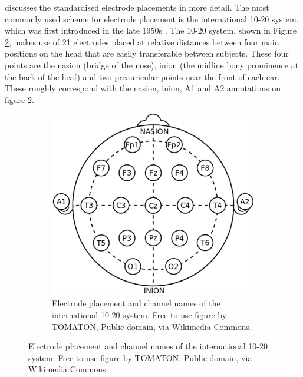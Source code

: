  discusses the standardised electrode placements in more detail.
The most commonly used scheme for electrode placement is the international 10-20 system, which was first introduced in the late 1950s \citep{internat_1020_system}.
The 10-20 system, shown in Figure \ref{fig:biomedical_signals_10_20_system_original}, makes use of 21 electrodes placed at relative distances between four main positions on the head that are easily transferable between subjects.
These four points are the nasion (bridge of the nose), inion (the midline bony prominence at the back of the heaf) and two preauricular points near the front of each ear.
These roughly correspond with the nasion, inion, A1 and A2 annotations on figure \ref{fig:biomedical_signals_10_20_system_original}.

\begin{figure}[ht]
    \centering
    \begin{subfigure}{0.45\textwidth}
        \centering
        \includegraphics[width=\textwidth]{../images/biosignals/10-20_system.pdf}
        \captionsetup{width=\linewidth}
        \captionsetup{justification=centering}
        \caption{Electrode placement and channel names of the international 10-20 system. Free to use figure by TOMATON, Public domain, via Wikimedia Commons.\\ \hfill}
        \label{fig:biomedical_signals_10_20_system_original}
    \end{subfigure}
    \hfill

\end{figure}

